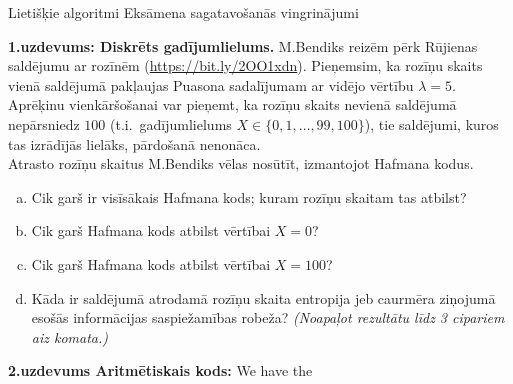 \documentclass[11pt]{article}
\begin{document}
\thispagestyle{empty}

% 


{\Large Lietišķie algoritmi \textendash{} Eksāmena sagatavošanās vingrinājumi}

\noindent
{\bf 1.uzdevums: Diskrēts gadījumlielums.}
M.Bendiks reizēm pērk Rūjienas saldējumu ar rozīnēm (\url{https://bit.ly/2OO1xdn}).
Pieņemsim, ka rozīņu skaits vienā saldējumā pakļaujas Puasona sadalījumam 
ar vidējo vērtību $\lambda = 5$. Aprēķinu vienkāršošanai var pieņemt, ka
rozīņu skaits nevienā saldējumā nepārsniedz $100$ (t.i.\ gadījumlielums
$X \in \{ 0,1,\ldots,99,100 \}$), tie saldējumi, kuros tas izrādījās lielāks, 
pārdošanā nenonāca.\\
Atrasto rozīņu skaitus M.Bendiks vēlas nosūtīt, izmantojot Hafmana kodus. 
\begin{enumerate}[(a)]
\item Cik garš ir visīsākais Hafmana kods; kuram rozīņu skaitam tas atbilst?
\item Cik garš Hafmana kods atbilst vērtībai $X=0$?
\item Cik garš Hafmana kods atbilst vērtībai $X=100$?
\item Kāda ir saldējumā atrodamā rozīņu skaita entropija jeb caurmēra ziņojumā
esošās informācijas saspiežamības robeža? {\em (Noapaļot rezultātu līdz 3 cipariem 
aiz komata.)}
\end{enumerate}

\vspace{6pt}
{\bf 2.uzdevums Aritmētiskais kods:}
We have the
\end{document}
